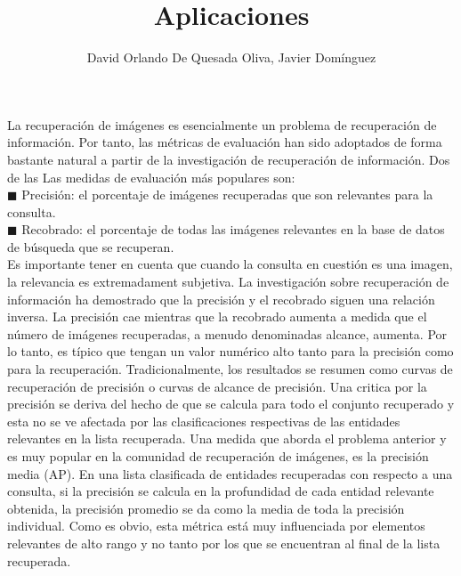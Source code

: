 \documentclass{llncs}
\begin{document}
La recuperación de imágenes es esencialmente un problema de recuperación de información. Por tanto, 
las métricas de evaluación han sido adoptados de forma bastante natural a partir de la investigación de 
recuperación de información. Dos de las Las medidas de evaluación más populares son:\\
$\blacksquare$ Precisión: el porcentaje de imágenes recuperadas que son relevantes para la consulta.\\
$\blacksquare$ Recobrado: el porcentaje de todas las imágenes relevantes en la base de datos de búsqueda que se recuperan.\\

Es importante tener en cuenta que cuando la consulta en cuestión es una imagen, la relevancia es extremadament subjetiva. 
La investigación sobre recuperación de información ha demostrado que la precisión y el recobrado siguen una relación inversa. 
La precisión cae mientras que la recobrado aumenta a medida que el número de imágenes recuperadas, a menudo denominadas alcance, 
aumenta. Por lo tanto, es típico que tengan un valor numérico alto tanto para la precisión como para la recuperación. 
Tradicionalmente, los resultados se resumen como curvas de recuperación de precisión o curvas de alcance de precisión. 
Una critica por la precisión se deriva del hecho de que se calcula para todo el conjunto recuperado y esta no se ve afectada 
por las clasificaciones respectivas de las entidades relevantes en la lista recuperada. Una medida que aborda el problema 
anterior y es muy popular en la comunidad de recuperación de imágenes, es la precisión media (AP). En una lista clasificada 
de entidades recuperadas con respecto a una consulta, si la precisión se calcula en la profundidad de cada entidad relevante 
obtenida, la precisión promedio se da como la media de toda la precisión individual. Como es obvio, esta métrica está muy 
influenciada por elementos relevantes de alto rango y no tanto por los que se encuentran al final de la lista recuperada.

\newpage

\title{Aplicaciones}
\author{David Orlando De Quesada Oliva, Javier Dom\'inguez}
\maketitle
\end{document}
